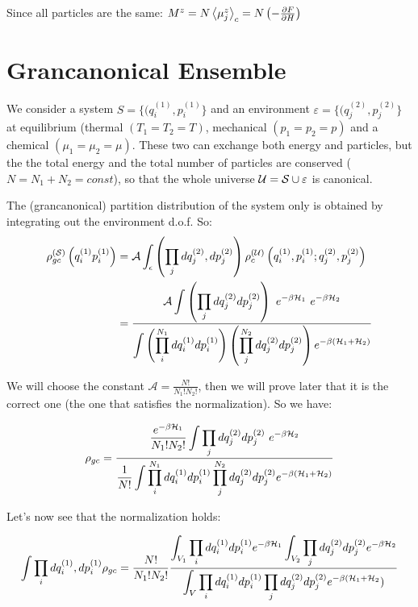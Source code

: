Since all particles are the same:  $M^z = N\left<\mu_j^z\right>_c = N \left(-\frac{\partial F}{\partial H}\right)$

\section{Grancanonical Ensemble}
We consider a system $S = \{ (q_i^{(1)}, p_i^{(1)}\}$ and an environment $\varepsilon = \{(q_j^{(2)}, p_j^{(2)}\}$ at equilibrium (thermal $(T_1 = T_2 = T)$, mechanical $(p_1 = p_2 = p)$ and a chemical $(\mu_1 = \mu_2 = \mu)$. These two can exchange both energy and particles, but the the total energy and the total number of particles are conserved ($N = N_1 + N_2 = const$), so that the whole universe $\mathcal{U} = \mathcal{S} \cup \varepsilon$ is canonical.

The (grancanonical) partition distribution of the system only is obtained by integrating
out the environment d.o.f. So:
\begin{align*}
\rho_{gc}^{(\mathcal{S})}\left(q_i^{(1)} p_i^{(1)}\right) &= \mathcal{A} \int_\epsilon\left(\prod_j dq_j^{(2)}, dp_j^{(2)}\right) \rho_c^{(\mathcal{U})}\left(q_i^{(1)}, p_i^{(1)}; q_j^{(2)}, p_j^{(2)}\right) \\
&= \frac{\mathcal{A}\displaystyle \int\left(\prod_j dq_j^{(2)} dp_j^{(2)}\right) \ e^{-\beta \mathcal{H}_1} \ e^{-\beta \mathcal{H}_2}}{\displaystyle\int\left(\prod_i^{N_1} dq_i^{(1)} dp_i^{(1)}\right)\left(\prod_j^{N_2}dq_j^{(2)}dp_j^{(2)}\right)  e^{-\beta(\mathcal{H}_1+ \mathcal{H}_2)}}
\end{align*}

We will choose the constant $\mathcal{A} = \frac{N!}{N_1!N_2!}$, then we will prove later that it is the correct one (the one that satisfies the normalization). So we have:

\begin{equation} \label{eq:GC-distribution}
\rho_{gc} = \frac{\displaystyle\frac{e^{-\beta \mathcal{H}_1}}{N_1!N_2!} \int\prod_j dq_j^{(2)} dp_j^{(2)} \ e ^{-\beta \mathcal{H}_2}}
{\displaystyle\frac1{N!} \int\prod_i^{N_1} dq_i^{(1)} dp_i^{(1)}\prod_j^{N_2}dq_j^{(2)} dp_j^{(2)}  e^{-\beta(\mathcal{H}_1+ \mathcal{H}_2)}}
\end{equation}

\vspace{15pt}
\Pf Let's now see that the normalization holds:

$$ \int\prod_i dq_i^{(1)}, dp_i^{(1)} \rho_{gc} = \frac{N!}{N_1!N_2!} \frac
{\displaystyle\int_{V_1} \prod_i dq_i^{(1)} dp_i^{(1)} e^{-\beta \mathcal{H}_1} \int_{V_2} \prod_j dq_j^{(2)} dp_j^{(2)} e^{-\beta \mathcal{H}_2}}
{\displaystyle\int_V\prod_i dq_i^{(1)} dp_i^{(1)}\prod_j dq_j^{(2)} dp_j^{(2)} e^{-\beta(\mathcal{H}_1+\mathcal{H}_2})}$$


